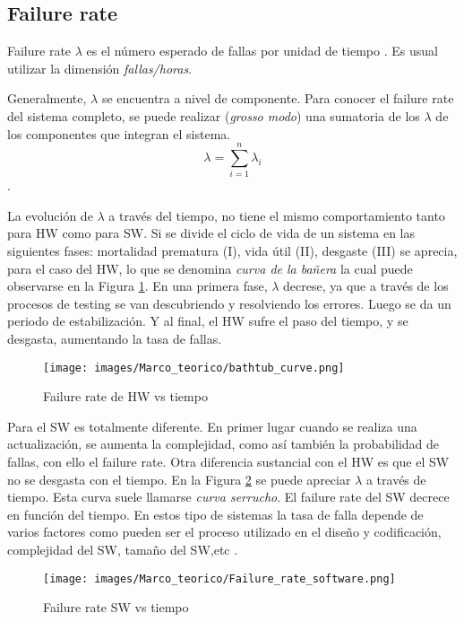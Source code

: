 \subsection{Failure rate}
Failure rate $\lambda$ es el número esperado de fallas por unidad de tiempo \citep{FTDesign}. Es
usual utilizar la dimensión \textit{fallas/horas}.

Generalmente, $\lambda$ se encuentra a nivel de componente. Para conocer el failure rate del
sistema completo, se puede realizar (\textit{grosso modo}) una sumatoria de los $\lambda$ de los
componentes que integran el sistema. $$\lambda=\sum_{i=1}^{n} \lambda_i$$.

La evolución de $\lambda$ a través del tiempo, no tiene el mismo comportamiento tanto para \ac{HW} como para \ac{SW}.
Si se divide el ciclo de vida de un sistema en las siguientes fases: mortalidad prematura (I), vida útil (II), desgaste (III) \citep{FTDesign}
se aprecia, para el caso del \ac{HW}, lo que se denomina \textit{curva de la bañera} la cual puede observarse en la Figura \ref{fig:bathtub_curve}.
En una primera fase, $\lambda$ decrese, ya que a través de los procesos de testing se van descubriendo y resolviendo los errores. Luego se da un periodo de estabilización.
Y al final, el \ac{HW} sufre el paso del tiempo, y se desgasta, aumentando la tasa de fallas.

\begin{figure}[h]
 \centering
 \texttt{[image: images/Marco\_teorico/bathtub\_curve.png]}
  \caption{Failure rate de HW vs tiempo }
\label{fig:bathtub_curve}
\end{figure}

Para el \ac{SW} es totalmente diferente. En primer lugar cuando se realiza una actualización, se aumenta la complejidad, como así también la probabilidad de fallas,
con ello el failure rate. Otra diferencia sustancial con el \ac{HW} es que el \ac{SW} no se desgasta con el tiempo. En la Figura \ref{fig:Failure_rate_software}
se puede apreciar $\lambda$ a través de tiempo. Esta curva suele llamarse \textit{curva serrucho}. El failure rate del \ac{SW} decrece en función del tiempo. En estos tipo de sistemas
la tasa de falla depende de varios factores como pueden ser el proceso utilizado en el diseño y codificación, complejidad del \ac{SW}, tamaño del \ac{SW},etc \citep{FTDesign}.

\begin{figure}[h]
 \centering
 \texttt{[image: images/Marco\_teorico/Failure\_rate\_software.png]}
  \caption{Failure rate SW vs tiempo }
\label{fig:Failure_rate_software}
\end{figure}

